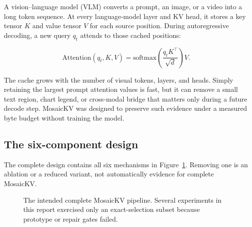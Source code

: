 \documentclass[11pt]{article}
\begin{document}
A vision--language model (VLM) converts a prompt, an image, or a video into a long token sequence.
At every language-model layer and KV head, it stores a key tensor $K$ and value tensor $V$ for
each source position.  During autoregressive decoding, a new query $q_t$ attends to those cached
positions:

\begin{equation}
  \mathrm{Attention}(q_t,K,V)
  = \mathrm{softmax}\!\left(\frac{q_tK^\top}{\sqrt{d}}\right)V.
\end{equation}

The cache grows with the number of visual tokens, layers, and heads.  Simply retaining the largest
prompt attention values is fast, but it can remove a small text region, chart legend, or cross-modal
bridge that matters only during a future decode step.  MosaicKV was designed to preserve such
evidence under a measured byte budget without training the model.

\subsection{The six-component design}

The complete design contains all six mechanisms in Figure~\ref{fig:pipeline}.  Removing one is an
ablation or a reduced variant, not automatically evidence for complete MosaicKV.

\begin{figure}[ht]
\centering
{}
\caption{The intended complete MosaicKV pipeline.  Several experiments in this report exercised
only an exact-selection subset because prototype or repair gates failed.}
\label{fig:pipeline}
\end{figure}
\end{document}
